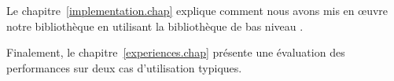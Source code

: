 \begin{introduction}
Le chapitre~\ref{implementation.chap}  explique comment nous avons mis en œuvre notre bibliothèque en utilisant la biblioth\`eque de bas niveau .

Finalement, le chapitre~\ref{experiences.chap}  pr\'esente une \'evaluation des performances sur deux cas d'utilisation typiques.

\end{introduction}

